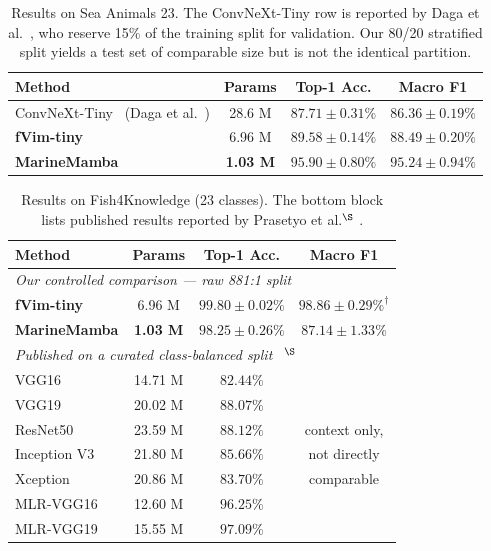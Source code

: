 \documentclass[runningheads]{llncs}
\begin{document}
\begin{table}[t]
\centering
\caption{Results on Sea Animals 23. The ConvNeXt-Tiny row is reported by Daga et al.~\cite{daga2026aquaselect}, who reserve 15\% of the training split for validation. Our 80/20 stratified split yields a test set of comparable size but is not the identical partition.}
\label{tab:sea23}
\begin{tabular}{lccc}
\toprule
Method & Params & Top-1 Acc. & Macro F1 \\
\midrule
ConvNeXt-Tiny~\cite{liu2022convnext} (Daga et al.~\cite{daga2026aquaselect}) & 28.6 M & $87.71\pm0.31\%$ & $86.36\pm0.19\%$ \\
\midrule
\textbf{fVim-tiny}         & 6.96 M & $89.58\pm0.14\%$ & $88.49\pm0.20\%$ \\
\textbf{MarineMamba}               & \textbf{1.03 M} & $\mathbf{95.90\pm0.80\%}$ & $\mathbf{95.24\pm0.94\%}$ \\
\bottomrule
\end{tabular}
\end{table}

\begin{table}[t]
\centering
\caption{Results on Fish4Knowledge (23 classes). The bottom block lists published results reported by Prasetyo et al.$^{\S}$ .}
\label{tab:fish4k}
\begin{tabular}{lccc}
\toprule
Method & Params & Top-1 Acc. & Macro F1 \\
\midrule
\multicolumn{4}{l}{\textit{Our controlled comparison --- raw 881:1 split}}\\
\textbf{fVim-tiny}        & 6.96 M & $\mathbf{99.80\pm0.02\%}$ & $98.86\pm0.29\%^{\dagger}$ \\
\textbf{MarineMamba}      & \textbf{1.03 M} & $98.25\pm0.26\%$ & $87.14\pm1.33\%$ \\
\midrule
\multicolumn{4}{l}{\textit{Published on a curated class-balanced split~\cite{prasetyo2021resvggnet}   }$^{\S}$}\\
VGG16        & 14.71 M & $82.44\%$ &  \\
VGG19        & 20.02 M & $88.07\%$ &  \\
ResNet50     & 23.59 M & $88.12\%$ & context only, \\
Inception V3 & 21.80 M & $85.66\%$ & not directly \\
Xception     & 20.86 M & $83.70\%$ & comparable \\
MLR-VGG16    & 12.60 M & $96.25\%$ &  \\
MLR-VGG19    & 15.55 M & $97.09\%$ &  \\
\bottomrule
\end{tabular}
\end{table}
\end{document}

